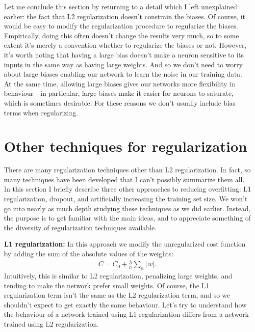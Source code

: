 \documentclass[a4paper,twoside,10pt]{book}
\begin{document}
Let me conclude this section by returning to a detail which I left unexplained earlier: the fact that L2 regularization doesn't constrain the biases. Of course, it would be easy to modify the regularization procedure to regularize the biases. Empirically, doing this often doesn't change the results very much, so to some extent it's merely a convention whether to regularize the biases or not. However, it's worth noting that having a large bias doesn't make a neuron sensitive to its inputs in the same way as having large weights. And so we don't need to worry about large biases enabling our network to learn the noise in our training data. At the same time, allowing large biases gives our networks more flexibility in behaviour - in particular, large biases make it easier for neurons to saturate, which is sometimes desirable. For these reasons we don't usually include bias terms when regularizing.


\section{Other techniques for regularization}
There are many regularization techniques other than L2 regularization. In fact, so many techniques have been developed that I can't possibly summarize them all. In this section I briefly describe three other approaches to reducing overfitting: L1 regularization, dropout, and artificially increasing the training set size. We won't go into nearly as much depth studying these techniques as we did earlier. Instead, the purpose is to get familiar with the main ideas, and to appreciate something of the diversity of regularization techniques available.

\textbf{L1 regularization:} In this approach we modify the unregularized cost function by adding the sum of the absolute values of the weights:
\begin{eqnarray}  C = C_0 + \frac{\lambda}{n} \sum_w |w|.\label{eq:95}
\end{eqnarray}
Intuitively, this is similar to L2 regularization, penalizing large weights, and tending to make the network prefer small weights. Of course, the L1 regularization term isn't the same as the L2 regularization term, and so we shouldn't expect to get exactly the same behaviour. Let's try to understand how the behaviour of a network trained using L1 regularization differs from a network trained using L2 regularization.
\end{document}
